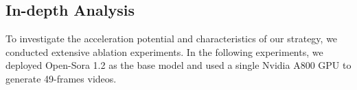 




\subsection{In-depth Analysis}
To investigate the acceleration potential and characteristics of our strategy, we conducted extensive ablation experiments. In the following experiments, we deployed Open-Sora 1.2 as the base model and used a single Nvidia A800 GPU to generate 49-frames videos.

